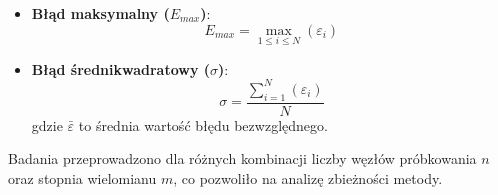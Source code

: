 \documentclass[twoside]{article}
\begin{document}
\begin{itemize}
    \item \textbf{Błąd maksymalny ($E_{max}$)}:
    \begin{equation}
    E_{max} = \max_{1 \le i \le N} (\varepsilon_i)
    \end{equation}
    
    \item \textbf{Błąd średnikwadratowy ($\sigma$)}:
    \begin{equation}
    \sigma = \frac{\sum_{i=1}^{N}(\varepsilon_{i})}{N}
    \end{equation}
    gdzie $\bar{\varepsilon}$ to średnia wartość błędu bezwzględnego.
\end{itemize}

Badania przeprowadzono dla różnych kombinacji liczby węzłów próbkowania $n$ oraz stopnia wielomianu $m$, co pozwoliło na analizę zbieżności metody.
\end{document}

